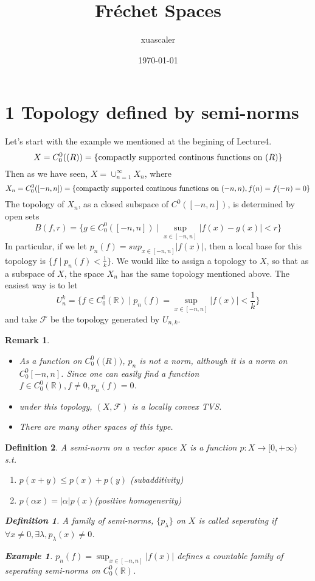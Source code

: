 \documentclass{article}
\title{Fr\'echet Spaces}
\author{xuascaler}
\date{\today}
\newtheorem*{definition}{Definition}
\newtheorem*{remark}{Remark}
\newtheorem*{example}{Example}
\begin{document}
\maketitle

\section*{1 Topology defined by semi-norms}
Let's start with the example we mentioned at the begining of Lecture4.
\[
    X = C_0^0(\mathbb(R)) = \{ \textnormal{compactly supported continous functions on } \mathbb(R)\}
\]
Then as we have seen, $X = \cup_{n=1}^{\infty}X_n$, where
\[
    X_n = C_0^0([-n, n]) = \{ \textnormal{compactly supported continous functions on } (-n, n), f(n) = f(-n) = 0\}
\]
The topology of $X_n$, as a closed subspace of $C^0([-n, n])$, is determined by open sets
\[
    B(f, r) = \{ g \in C^0_0([-n, n]) \mid \sup_{x \in [-n, n]}|f(x) - g(x)| < r \}
\]
In particular, if we let $p_n(f) = sup_{x\in[-n, n]}{|f(x)|}$, then a local base for this topology is $\{f \mid p_n(f) < \frac{1}{k}\}$.
We would like to assign a topology to $X$, so that as a subspace of $X$, the space $X_n$ has the same topology mentioned above.
The easiest way is to let 
\[U_{n}^{k} = \{f \in C_0^0(\mathbb{R}) \mid p_n(f) = \sup_{x \in [-n, n]}{|f(x)| < \frac{1}{k}}\}\]
and take $\mathcal{F}$ be the topology generated by $U_{n,k}$.
\begin{remark} \hfill
    \begin{itemize}
        \item As a function on $C_0^0(\mathbb(R))$, $p_n$ is not a norm, although it is a norm on $C_0^0{[-n, n]}$.
        Since one can easily find a function $f \in C_0^0(\mathbb{R}), f \ne 0, p_n(f) = 0$.
        \item under this topology, $(X, \mathcal{F})$ is a locally convex TVS.
        \item There are many other spaces of this type.
    \end{itemize}
\end{remark}
\begin{definition}
    A semi-norm on a vector space $X$ is a function $p: X \rightarrow [0, + \infty)$ s.t.
    \begin{enumerate}
        \item $p(x + y) \le p(x) + p(y)$ (subadditivity)
        \item $p(\alpha x) = |\alpha| p(x)$(positive homogenerity)
    \end{enumerate}
    \begin{definition}
        A family of semi-norms, $\{p_{\lambda}\}$ on $X$ is called seperating if $ \forall x \ne 0, \exists \lambda, p_{\lambda}(x) \ne 0$.
    \end{definition}
    \begin{example}
        $p_n(f) = \sup_{x \in [-n, n]}{|f(x)|}$ defines a countable family of seperating semi-norms on $C_0^0(\mathbb{R})$.
    \end{example}
\end{definition}
\end{document}
